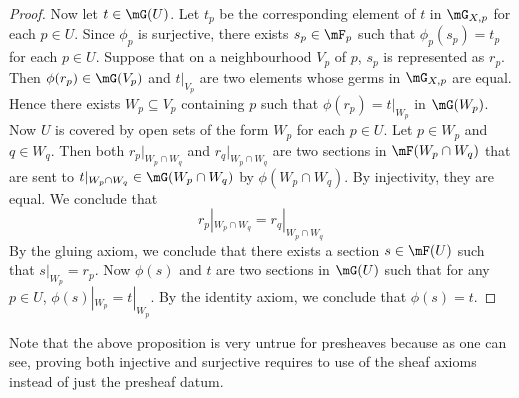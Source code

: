 \documentclass[a4paper]{article}
\begin{document}
\begin{prp}{}{}
\begin{proof}
Now let $t\in\mG(U)$. Let $t_p$ be the corresponding element of $t$ in $\mG_{X,p}$ for each $p\in U$. Since $\phi_p$ is surjective, there exists $s_p\in\mF_p$ such that $\phi_p(s_p)=t_p$ for each $p\in U$. Suppose that on a neighbourhood $V_p$ of $p$, $s_p$ is represented as $r_p$. Then $\phi(r_p)\in\mG(V_p)$ and $t|_{V_p}$ are two elements whose germs in $\mG_{X,p}$ are equal. Hence there exists $W_p\subseteq V_p$ containing $p$ such that $\phi(r_p)=t|_{W_p}$ in $\mG(W_p)$. Now $U$ is covered by open sets of the form $W_p$ for each $p\in U$. Let $p\in W_p$ and $q\in W_q$. Then both $r_p|_{W_p\cap W_q}$ and $r_q|_{W_p\cap W_q}$ are two sections in $\mF(W_p\cap W_q)$ that are sent to $t|_{W_p\cap W_q}\in\mG(W_p\cap W_q)$ by $\phi(W_p\cap W_q)$. By injectivity, they are equal. We conclude that $$r_p|_{W_p\cap W_q}=r_q|_{W_p\cap W_q}$$ By the gluing axiom, we conclude that there exists a section $s\in\mF(U)$ such that $s|_{W_p}=r_p$. Now $\phi(s)$ and $t$ are two sections in $\mG(U)$ such that for any $p\in U$, $\phi(s)|_{W_p}=t|_{W_p}$. By the identity axiom, we conclude that $\phi(s)=t$. 
\end{proof}
\end{prp}

Note that the above proposition is very untrue for presheaves because as one can see, proving both injective and surjective requires to use of the sheaf axioms instead of just the presheaf datum. 
\end{document}
